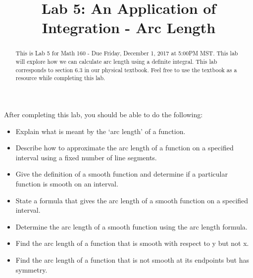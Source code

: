 \documentclass{ximera}
\title{Lab 5: An Application of Integration - Arc Length}
\begin{document}
\begin{abstract}
This is Lab 5 for Math 160 - Due Friday, December 1, 2017 at 5:00PM MST. This lab will explore how we can calculate arc length using a definite integral.  This lab corresponds to section 6.3 in our physical textbook.  Feel free to use the textbook as a resource while completing this lab.
\end{abstract}

\maketitle

\begin{sectionOutcomes}

After completing this lab, you should be able to do the following: 

\begin{itemize}
\item Explain what is meant by the `arc length' of a function.
\item Describe how to approximate the arc length of a function on a specified interval using a fixed number of line segments.
\item Give the definition of a smooth function and determine if a particular function is smooth on an interval.
\item State a formula that gives the arc length of a smooth function on a specified interval. 
\item Determine the arc length of a smooth function using the arc length formula.
\item Find the arc length of a function that is smooth with respect to y but not x.
\item Find the arc length of a function that is not smooth at its endpoints but has symmetry. 
\end{itemize}

\end{sectionOutcomes}
\end{document}
